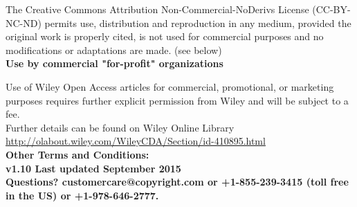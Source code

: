 The Creative Commons Attribution Non-Commercial-NoDerivs License (CC-BY-NC-ND) permits use, distribution and reproduction in any medium, provided the original work is properly cited, is not used for commercial purposes and no modifications or adaptations are made. (see below)\\

\noindent \textbf{Use by commercial "for-profit" organizations}

Use of Wiley Open Access articles for commercial, promotional, or marketing purposes requires further explicit permission from Wiley and will be subject to a fee.\\

Further details can be found on Wiley Online Library \url{http://olabout.wiley.com/WileyCDA/Section/id-410895.html}\\

\noindent \textbf{Other Terms and Conditions:}\\

\noindent \textbf{v1.10 Last updated September 2015}\\

\noindent \textbf{Questions? customercare@copyright.com or +1-855-239-3415 (toll free in the US) or +1-978-646-2777.}